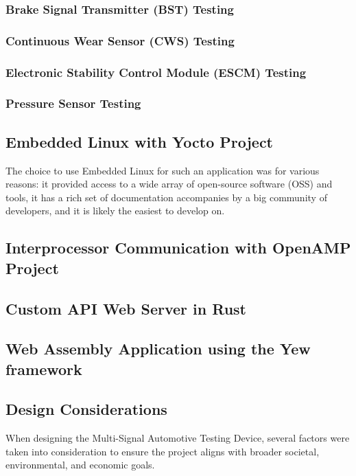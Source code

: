 \documentclass[12pt]{article}
\begin{document}
\subsubsection{Brake Signal Transmitter (BST) Testing}

\subsubsection{Continuous Wear Sensor (CWS) Testing}

\subsubsection{Electronic Stability Control Module (ESCM) Testing}

\subsubsection{Pressure Sensor Testing}

\subsection{Embedded Linux with Yocto Project}
The choice to use Embedded Linux for such an application was for various reasons:
it provided access to a wide array of open-source software (OSS) and tools, it 
has a rich set of documentation accompanies by a big community of developers, and
it is likely the easiest to develop on. 

\subsection{Interprocessor Communication with OpenAMP Project}

\subsection{Custom API Web Server in Rust}

\subsection{Web Assembly Application using the Yew framework}

\subsection{Design Considerations}
When designing the Multi-Signal Automotive Testing Device, several factors were
taken into consideration to ensure the project aligns with broader societal,
environmental, and economic goals.
\end{document}
